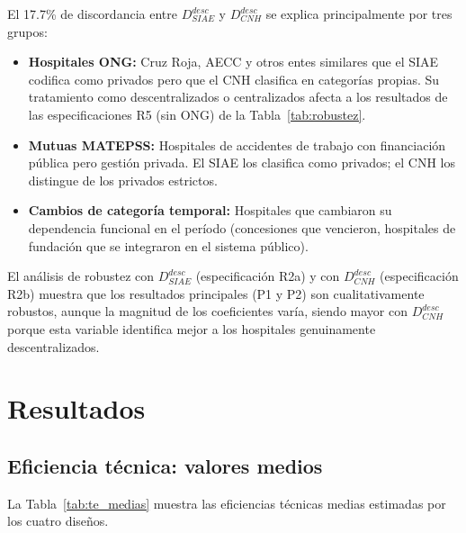 \documentclass[12pt, a4paper, twoside, openright]{book}
\theoremstyle{plain}
\theoremstyle{definition}
\theoremstyle{remark}
\begin{document}
El 17.7\% de discordancia entre $D^{desc}_{SIAE}$ y $D^{desc}_{CNH}$ se explica principalmente por tres grupos:

\begin{itemize}
  \item \textbf{Hospitales ONG:} Cruz Roja, AECC y otros entes similares que el SIAE codifica como privados pero que el CNH clasifica en categorías propias. Su tratamiento como descentralizados o centralizados afecta a los resultados de las especificaciones R5 (sin ONG) de la Tabla~\ref{tab:robustez}.
  \item \textbf{Mutuas MATEPSS:} Hospitales de accidentes de trabajo con financiación pública pero gestión privada. El SIAE los clasifica como privados; el CNH los distingue de los privados estrictos.
  \item \textbf{Cambios de categoría temporal:} Hospitales que cambiaron su dependencia funcional en el período (concesiones que vencieron, hospitales de fundación que se integraron en el sistema público).
\end{itemize}

El análisis de robustez con $D^{desc}_{SIAE}$ (especificación R2a) y con $D^{desc}_{CNH}$ (especificación R2b) muestra que los resultados principales (P1 y P2) son cualitativamente robustos, aunque la magnitud de los coeficientes varía, siendo mayor con $D^{desc}_{CNH}$ porque esta variable identifica mejor a los hospitales genuinamente descentralizados.



\chapter{Resultados}
\label{ch:resultados}

\section{Eficiencia técnica: valores medios}

La Tabla~\ref{tab:te_medias} muestra las eficiencias técnicas medias estimadas por los cuatro diseños.
\end{document}
